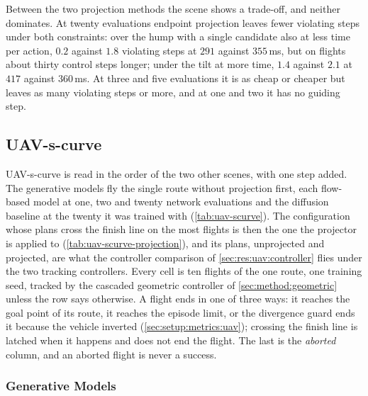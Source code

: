 Between the two projection methods the scene shows a trade-off, and neither dominates. At twenty evaluations
endpoint projection leaves fewer violating steps under both constraints: over the hump with a single
candidate also at less time per action, $0.2$ against $1.8$ violating steps at $291$ against $355$\,ms, but on
flights about thirty control steps longer; under the tilt at more time, $1.4$ against $2.1$ at $417$ against
$360$\,ms. At three and five evaluations it is as cheap or cheaper but leaves as many violating steps or more,
and at one and two it has no guiding step.

\FloatBarrier
\subsection{UAV-s-curve}\label{sec:res:uav:scurve}

UAV-s-curve is read in the order of the two other scenes, with one step added. The generative models
fly the single route without projection first, each flow-based model at one, two and twenty network
evaluations and the diffusion baseline at the twenty it was trained with (\autoref{tab:uav-scurve}). The
configuration whose plans cross the finish line on the most flights is then the one the projector is
applied to (\autoref{tab:uav-scurve-projection}), and its plans, unprojected and projected, are what the
controller comparison of \autoref{sec:res:uav:controller} flies under the two tracking controllers.
Every cell is ten flights of the one route, one training seed, tracked by the cascaded geometric
controller of \autoref{sec:method:geometric} unless the row says otherwise. A flight ends in one of
three ways: it reaches the goal point of its route, it reaches the episode limit, or the divergence guard
ends it because the vehicle inverted (\autoref{sec:setup:metrics:uav}); crossing the finish line is latched
when it happens and does not end the flight. The last is the \emph{aborted} column,
and an aborted flight is never a success.

\subsubsection{Generative Models}\label{sec:res:uav:scurve:models}

